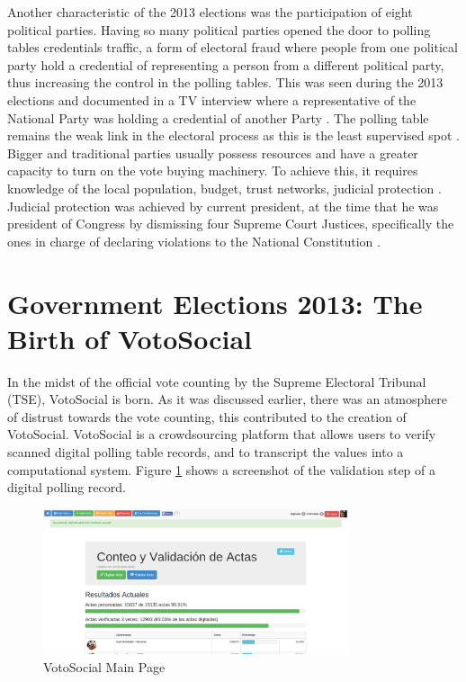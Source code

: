 \documentclass[letterpaper,10pt]{article}
\begin{document}
Another characteristic of the 2013 elections was the participation of eight political parties. Having so many political parties opened the door to polling tables credentials traffic, a form of electoral fraud where people from one political party hold a credential of representing a person from a different political party, thus increasing the control in the polling tables. This was seen during the 2013 elections and documented in a TV interview where a representative of the National Party was holding a credential of another Party \citep{vidap}. The polling table remains the weak link in the electoral process as this is the least supervised spot \citep{romero2014}. Bigger and traditional parties usually possess resources and have a greater capacity to turn on the vote buying machinery. To achieve this, it requires knowledge of the local population, budget, trust networks, judicial protection \citep{gonza2014}. Judicial protection was achieved by current president, at the time that he was president of Congress by dismissing four Supreme Court Justices, specifically the ones in charge of declaring violations to the National Constitution \citep{csj2012}.


\section{Government Elections 2013: The Birth of VotoSocial}

In the midst of the official vote counting by the Supreme Electoral Tribunal (TSE), VotoSocial is born. As it was discussed earlier, there was an atmosphere of distrust towards the vote counting, this contributed to the creation of VotoSocial. VotoSocial is a crowdsourcing platform that allows users to verify scanned digital polling table records, and to transcript the values into a computational system. Figure \ref{fig:main} shows a screenshot of the validation step of a digital polling record.

\begin{figure}[h!]
    \centering
    \includegraphics[width=0.8\textwidth]{images/vs-main}
    \caption{VotoSocial Main Page}
    \label{fig:main}
\end{figure}
\end{document}
